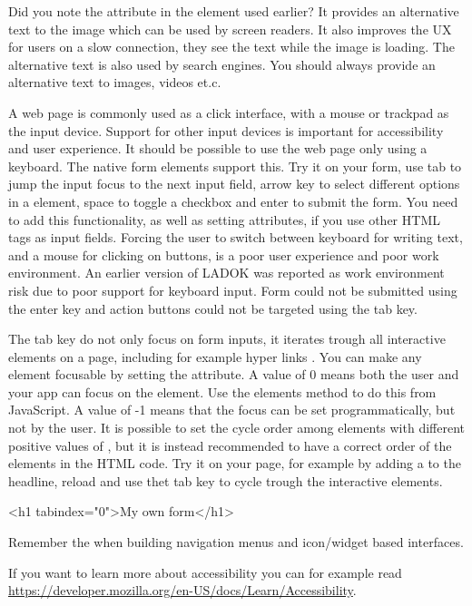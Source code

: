 \documentclass[fleqn, article, a4paper]{memoir}
\begin{document}
Did you note the  attribute in the  element used earlier? It provides an alternative text to the image which can be used by screen readers. It also improves the UX for users on a slow connection, they see the text while the image is loading. The alternative text is also used by search engines. You should always provide an alternative text to images, videos et.c.

A web page is commonly used as a click interface, with a mouse or trackpad as the input device. Support for other input devices is important for accessibility and user experience. It should be possible to use the web page only using a keyboard. The native form elements support this. Try it on your form, use tab to jump the input focus to the next input field, arrow key to select different options in a  element, space to toggle a checkbox and enter to submit the form. You need to add this functionality, as well as setting  attributes, if you use other HTML tags as input fields. Forcing the user to switch between keyboard for writing text, and a mouse for clicking on buttons, is a poor user experience and poor work environment. An earlier version of LADOK was reported as work environment risk due to poor support for keyboard input. Form could not be submitted using the enter key and action buttons could not be targeted using the tab key.

The tab key do not only focus on form inputs, it iterates trough all interactive elements on a page, including for example hyper links . You can make any element focusable by setting the  attribute. A value of 0 means both the user and your app can focus on the element. Use the elements  method to do this from JavaScript. A value of -1 means that the focus can be set programmatically, but not by the user. It is possible to set the cycle order among elements with different positive values of , but it is instead recommended to have a correct order of the elements in the HTML code. Try it on your page, for example by adding a  to the headline, reload and use thet tab key to cycle trough the interactive elements.
\begin{Code}
<h1 tabindex="0">My own form</h1>
\end{Code}
Remember the  when building navigation menus and icon/widget based interfaces.

If you want to learn more about accessibility you can for example read \url{https://developer.mozilla.org/en-US/docs/Learn/Accessibility}.
\end{document}
